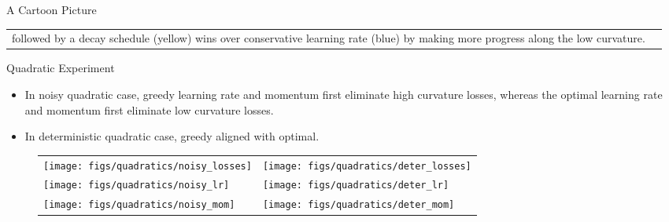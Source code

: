 \documentclass[final,t]{beamer}
\begin{document}
\begin{frame}{}
\begin{columns}[t]
\begin{column}{.32\linewidth}
\begin{exampleblock}{A Cartoon Picture}
\begin{tabular}{p{}p{}}
    followed by a decay schedule
    (yellow) wins over conservative learning rate (blue) by making more progress along the low curvature.
    \end{tabular}
    \vspace{-0.8in}
	\end{exampleblock}
    
    \vspace{0.8in}
    \begin{exampleblock}{Quadratic Experiment}
    \begin{itemize}
    \item In noisy quadratic case, greedy learning rate and momentum first eliminate high curvature losses, whereas the optimal learning rate and momentum first eliminate low curvature losses.
    \item In deterministic quadratic case, greedy aligned with optimal.
    \end{itemize}
        \begin{figure}[t!]
        \begin{center}
        \begin{tabular}{p{}p{}}%
        \hspace{0pt}\texttt{[image: figs/quadratics/noisy\_losses]}&\texttt{[image: figs/quadratics/deter\_losses]} \\
        \vspace{-0.2in}
        \hspace{3pt}\texttt{[image: figs/quadratics/noisy\_lr]}&\vspace{-0.2in}\hspace{5pt}\texttt{[image: figs/quadratics/deter\_lr]}\\
        \vspace{-0.2in}\hspace{1pt}
        \texttt{[image: figs/quadratics/noisy\_mom]}&\vspace{-0.2in}\hspace{7pt}\texttt{[image: figs/quadratics/deter\_mom]}%
        \end{tabular}
        \vspace{-0.1in}
        \label{fig:noisy_quadratic}
        \end{center}
        \vspace{-0.7cm}
        \end{figure}
    \end{exampleblock}


\end{column}
\end{columns}
\end{frame}
\end{document}
